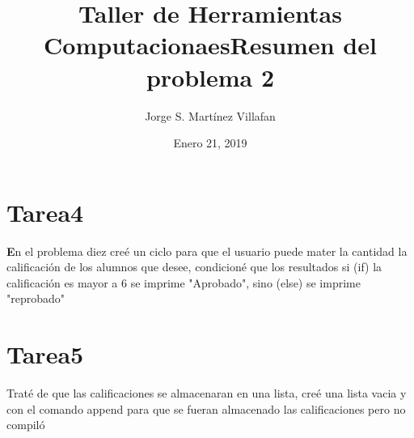 \documentclass[letterpaper, 12pt, oneside]{article}%
\title{\Huge Taller de Herramientas Computacionaes}
\author{Jorge S. Martínez Villafan}
\date{Enero 21, 2019}
\begin{document}
\maketitle
\newpage
\title{Resumen del problema 2}
\section{Tarea4}
\textbf En el problema diez creé un ciclo para que el usuario puede mater la cantidad la calificación de los alumnos que desee, condicioné que los resultados si (if) la calificación es mayor a 6 se imprime "Aprobado", sino (else) se imprime "reprobado"
\section{Tarea5}
Traté de que las calificaciones se almacenaran en una lista, creé una lista vacia y con el comando append para que se fueran almacenado las calificaciones pero no compiló
\end{document}
